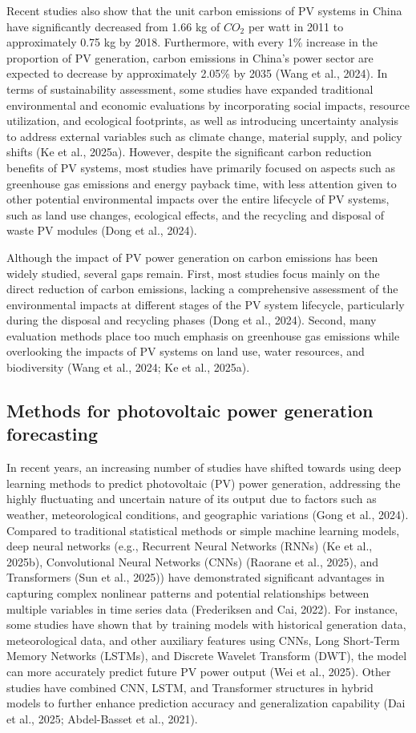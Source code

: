 \documentclass{article}
\begin{document}
	Recent studies also show that the unit carbon emissions of PV systems in China have significantly decreased from 1.66 kg of $CO_2$ per watt in 2011 to approximately 0.75 kg by 2018. Furthermore, with every 1\% increase in the proportion of PV generation, carbon emissions in China's power sector are expected to decrease by approximately 2.05\% by 2035 (Wang et al., 2024). In terms of sustainability assessment, some studies have expanded traditional environmental and economic evaluations by incorporating social impacts, resource utilization, and ecological footprints, as well as introducing uncertainty analysis to address external variables such as climate change, material supply, and policy shifts (Ke et al., 2025a). However, despite the significant carbon reduction benefits of PV systems, most studies have primarily focused on aspects such as greenhouse gas emissions and energy payback time, with less attention given to other potential environmental impacts over the entire lifecycle of PV systems, such as land use changes, ecological effects, and the recycling and disposal of waste PV modules (Dong et al., 2024).
	
	Although the impact of PV power generation on carbon emissions has been widely studied, several gaps remain. First, most studies focus mainly on the direct reduction of carbon emissions, lacking a comprehensive assessment of the environmental impacts at different stages of the PV system lifecycle, particularly during the disposal and recycling phases (Dong et al., 2024). Second, many evaluation methods place too much emphasis on greenhouse gas emissions while overlooking the impacts of PV systems on land use, water resources, and biodiversity (Wang et al., 2024; Ke et al., 2025a).
	
	\subsection{Methods for photovoltaic power generation forecasting}
	In recent years, an increasing number of studies have shifted towards using deep learning methods to predict photovoltaic (PV) power generation, addressing the highly fluctuating and uncertain nature of its output due to factors such as weather, meteorological conditions, and geographic variations (Gong et al., 2024). Compared to traditional statistical methods or simple machine learning models, deep neural networks (e.g., Recurrent Neural Networks (RNNs) (Ke et al., 2025b), Convolutional Neural Networks (CNNs) (Raorane et al., 2025), and Transformers (Sun et al., 2025)) have demonstrated significant advantages in capturing complex nonlinear patterns and potential relationships between multiple variables in time series data (Frederiksen and Cai, 2022). For instance, some studies have shown that by training models with historical generation data, meteorological data, and other auxiliary features using CNNs, Long Short-Term Memory Networks (LSTMs), and Discrete Wavelet Transform (DWT), the model can more accurately predict future PV power output (Wei et al., 2025). Other studies have combined CNN, LSTM, and Transformer structures in hybrid models to further enhance prediction accuracy and generalization capability (Dai et al., 2025; Abdel-Basset et al., 2021).
	
\end{document}
